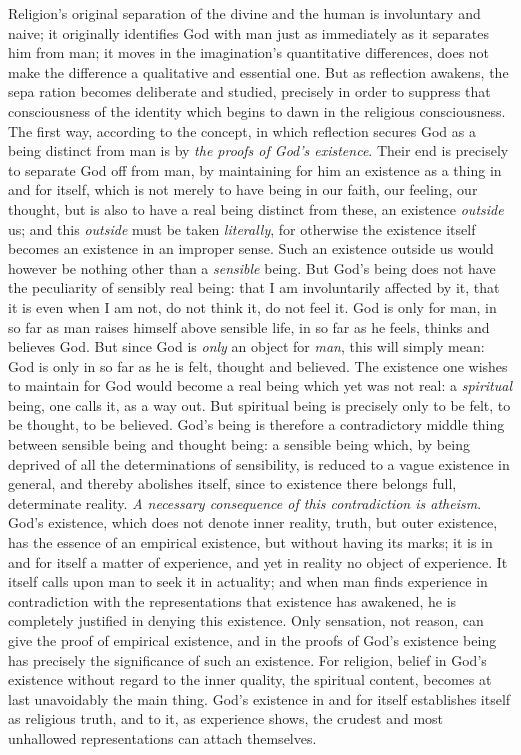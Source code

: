 \documentclass[12pt,a4paper]{book}
\begin{document}
Religion's original separation of the divine and the human is involuntary and
naive; it originally identifies God with man just as immediately as it
separates him from man; it moves in the imagination's quantitative
differences, does not make the difference a qualitative and essential one. But
as reflection awakens, the sepa\-%
ration becomes deliberate and studied, precisely in order to suppress that
consciousness of the identity which begins to dawn in the religious
consciousness. The first way, according to the concept, in which reflection
secures God as a being distinct from man is by \emph{the proofs of God's
existence}. Their end is precisely to separate God off from man, by
maintaining for him an existence as a thing in and for itself, which is not
merely to have being in our faith, our feeling, our thought, but is also to
have a real being distinct from these, an existence \emph{outside} us; and
this \emph{outside} must be taken \emph{literally}, for otherwise the
existence itself becomes an existence in an improper sense. Such an existence
outside us would however be nothing other than a \emph{sensible} being. But
God's being does not have the peculiarity of sensibly real being: that I am
involuntarily affected by it, that it is even when I am not, do not think it,
do not feel it. God is only for man, in so far as man raises himself above
sensible life, in so far as he feels, thinks and believes God. But since God
is \emph{only} an object for \emph{man}, this will simply mean: God is only in
so far as he is felt, thought and believed. The existence one wishes to
maintain for God would become a real being which yet was not real: a
\emph{spiritual} being, one calls it, as a way out. But spiritual being is
precisely only to be felt, to be thought, to be believed. God's being is
therefore a contradictory middle thing between sensible being and thought
being: a sensible being which, by being deprived of all the determinations of
sensibility, is reduced to a vague existence in general, and thereby abolishes
itself, since to existence there belongs full, determinate reality. \emph{A
necessary consequence of this contradiction is atheism}. God's existence,
which does not denote inner reality, truth, but outer existence, has the
essence of an empirical existence, but without having its marks; it is in and
for itself a matter of experience, and yet in reality no object of experience.
It itself calls upon man to seek it in actuality; and when man finds
experience in contradiction with the representations that existence has
awakened, he is completely justified in
denying this existence. Only sensation, not reason, can give the proof of
empirical existence, and in the proofs of God's existence being has precisely
the significance of such an existence. For religion, belief in God's existence
without regard to the inner quality, the spiritual content, becomes at last
unavoidably the main thing. God's existence in and for itself establishes
itself as religious truth, and to it, as experience shows, the crudest and
most unhallowed representations can attach themselves.
\end{document}
